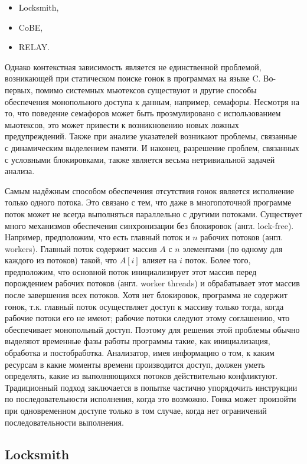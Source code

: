 \begin{itemize}
  \item Locksmith,
  \item CoBE,
  \item RELAY.
\end{itemize}

Однако контекстная зависимость является не единственной проблемой, возникающей при статическом поиске гонок в программах на языке C. Во-первых, помимо системных мьютексов существуют и другие способы обеспечения монопольного доступа к данным, например, семафоры. Несмотря на то, что поведение семафоров может быть проэмулировано с использованием мьютексов, это может привести к возникновению новых ложных предупреждений. Также при анализе указателей возникают проблемы, связанные с динамическим выделением памяти. И наконец, разрешение проблем, связанных с условными блокировками, также является весьма нетривиальной задачей анализа.

Самым надёжным способом обеспечения отсутствия гонок является исполнение только одного потока. Это связано с тем, что даже в многопоточной программе поток может не всегда выполняться параллельно с другими потоками. Существует много механизмов обеспечения синхронизации без блокировок (англ. lock-free). Например, предположим, что есть главный поток и $n$ рабочих потоков (англ. workers). Главный поток содержит массив $A$ с $n$ элементами (по одному для каждого из потоков) такой, что $A[i]$ влияет на $i$  поток. Более того, предположим, что основной поток инициализирует этот массив перед порождением рабочих потоков (англ. worker threads) и обрабатывает этот массив после завершения всех потоков. Хотя нет блокировок, программа не содержит гонок, т.к. главный поток осуществляет доступ к массиву только тогда, когда рабочие потоки его не имеют; рабочие потоки следуют этому соглашению, что обеспечивает монопольный доступ. Поэтому для решения этой проблемы обычно выделяют временные фазы работы программы такие, как инициализация, обработка и постобработка. Анализатор, имея информацию о том, к каким ресурсам в какие моменты времени производится доступ, должен уметь определять, какие из выполняющихся потоков действительно конфликтуют. Традиционный подход заключается в попытке частично упорядочить инструкции по последовательности исполнения, когда это возможно. Гонка может произойти при одновременном доступе только в том случае, когда нет ограничений последовательности выполнения.

\subsection{Locksmith}

